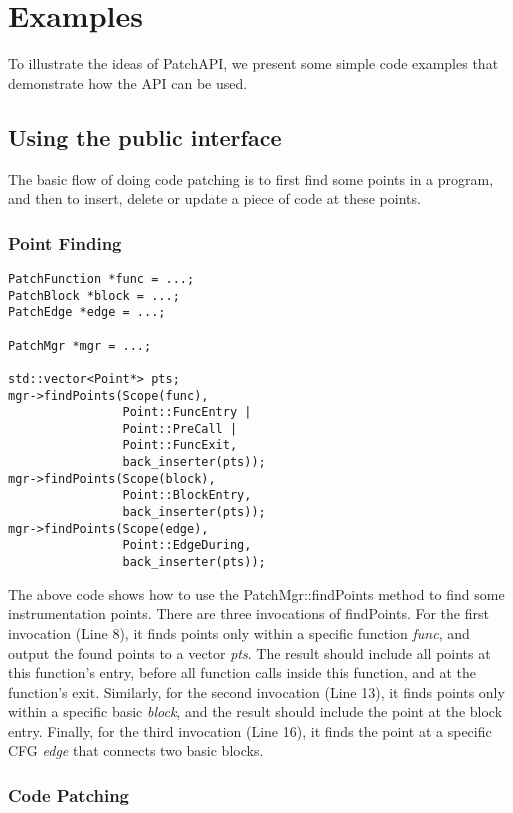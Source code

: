 \section{Examples} \label{sec-example}
To illustrate the ideas of PatchAPI, we present some simple code examples that
demonstrate how the API can be used.

\subsection{Using the public interface}
The basic flow of doing code patching is to first find some points in a program,
and then to insert, delete or update a piece of code at these points.
\subsubsection{Point Finding} \label{sec-example-pt}

\lstset{numbers=left}
\begin{lstlisting}
PatchFunction *func = ...;
PatchBlock *block = ...;
PatchEdge *edge = ...;

PatchMgr *mgr = ...;

std::vector<Point*> pts;
mgr->findPoints(Scope(func),
                Point::FuncEntry | 
                Point::PreCall | 
                Point::FuncExit,
                back_inserter(pts));
mgr->findPoints(Scope(block),
                Point::BlockEntry,
                back_inserter(pts));
mgr->findPoints(Scope(edge),
                Point::EdgeDuring,
                back_inserter(pts));
\end{lstlisting}
The above code shows how to use the PatchMgr::findPoints method to find some
instrumentation points. There are three invocations of findPoints. For the first
invocation (Line 8), it finds points only within a specific function
\emph{func}, and output the found points to a vector \emph{pts}. The result
should include all points at this function's entry, before all function calls
inside this function, and at the function's exit. Similarly, for the second
invocation (Line 13), it finds points only within a specific basic \emph{block},
and the result should include the point at the block entry. Finally, for the
third invocation (Line 16), it finds the point at a specific CFG \emph{edge}
that connects two basic blocks.

\subsubsection{Code Patching}

